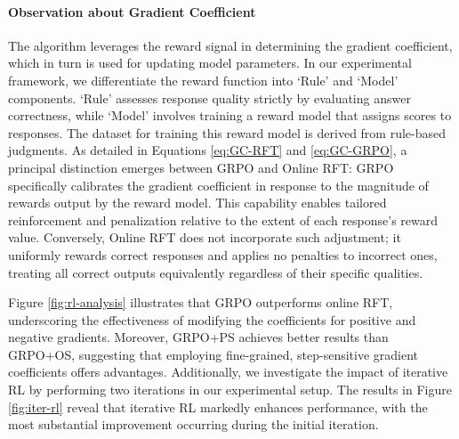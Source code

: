 \begin{itemize}[topsep=0pt]
\begin{itemize}[topsep=0pt]
\paragraph{Observation about Gradient Coefficient} The algorithm leverages the reward signal in determining the gradient coefficient, which in turn is used for updating model parameters. In our experimental framework, we differentiate the reward function into `Rule' and `Model' components. `Rule' assesses response quality strictly by evaluating answer correctness, while `Model' involves training a reward model that assigns scores to responses. The dataset for training this reward model is derived from rule-based judgments. As detailed in Equations \ref{eq:GC-RFT} and \ref{eq:GC-GRPO}, a principal distinction emerges between GRPO and Online RFT: GRPO specifically calibrates the gradient coefficient in response to the magnitude of rewards output by the reward model. This capability enables tailored reinforcement and penalization relative to the extent of each response’s reward value. Conversely, Online RFT does not incorporate such adjustment; it uniformly rewards correct responses and applies no penalties to incorrect ones, treating all correct outputs equivalently regardless of their specific qualities.

Figure \ref{fig:rl-analysis} illustrates that GRPO outperforms online RFT, underscoring the effectiveness of modifying the coefficients for positive and negative gradients. Moreover, GRPO+PS achieves better results than GRPO+OS, suggesting that employing fine-grained, step-sensitive gradient coefficients offers advantages. Additionally, we investigate the impact of iterative RL by performing two iterations in our experimental setup. The results in Figure \ref{fig:iter-rl} reveal that iterative RL markedly enhances performance, with the most substantial improvement occurring during the initial iteration.


\end{itemize}
\end{itemize}
